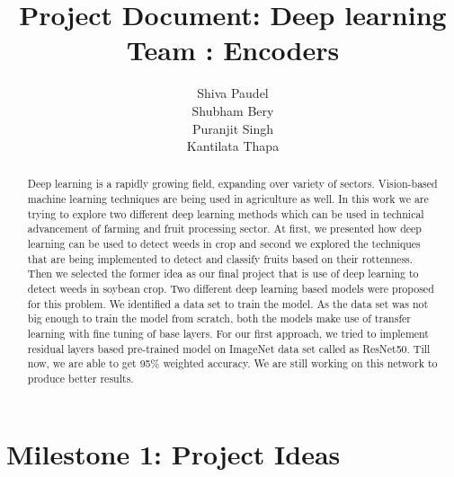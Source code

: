 \documentclass{report}
\title{Project Document: Deep learning \\ Team : Encoders}
\author{Shiva Paudel\\
Shubham Bery\\
Puranjit Singh\\
Kantilata Thapa\\
}
\date{}
\begin{document}
\maketitle

\tableofcontents

\begin{abstract}
Deep learning is a rapidly growing field, expanding over variety of sectors. Vision-based machine learning techniques are being used in agriculture as well. In this work we are trying to explore two different deep learning methods which can be used in technical advancement of farming and fruit processing sector. At first, we presented how deep learning can be used to detect weeds in crop and second we explored the techniques that are being implemented to detect and classify fruits based on their rottenness. Then we selected the former idea as our final project that is use of deep learning to detect weeds in soybean crop. Two different deep learning based models were proposed for this problem. We identified a data set to train the model. As the data set was not big enough to train the model from scratch, both the models make use of transfer learning with fine tuning of base layers. For our first approach, we tried to implement residual layers based pre-trained model on ImageNet data set called as ResNet50. Till now, we are able to get 95\% weighted accuracy. We are still working on this network to produce better results.
\end{abstract}

\chapter{Milestone 1: Project Ideas}
\end{document}
